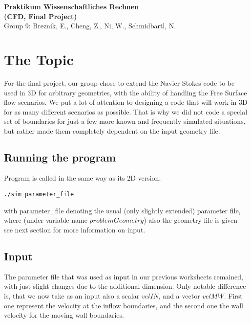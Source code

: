 \documentclass[a4paper, 12pt]{article}
\begin{document}
\begin{center}
{\LARGE \bf Praktikum Wissenschaftliches Rechnen \\ \vspace{0.2cm} (CFD, Final Project)}\\
\vspace{0.6cm}
{\small Group 9: Breznik, E., Cheng, Z., Ni, W., Schmidbartl, N.}
\end{center}
\normalfont
\section{The Topic}\label{sec:topic}
For the final project, our group chose to extend the Navier Stokes code to be used in 3D for arbitrary geometries, with the ability of handling
the Free Surface flow scenarios.
We put a lot of attention to designing a code that will work in 3D for as many different scenarios as possible. That is why we did not code a
special set of boundaries for just a few more known and frequently simulated situations, but rather made them completely dependent on the input
geometry file.

\subsection{Running the program}
Program is called in the same way as its 2D version;
\begin{center} 
\begin{verbatim}
./sim parameter_file
\end{verbatim}
\end{center}
with parameter\_file denoting the usual (only slightly extended) parameter file, where (under variable name $problemGeometry$) also the geometry file is 
given - see next section for more information on input. 

\subsection{Input}\label{sec:input}
The parameter file that was used as input in our previous worksheets remained, with just slight changes due to the additional dimension.
Only notable difference is, that we now take as an input also a scalar $velIN$, and a vector $velMW$. First one represent the velocity at the
inflow boundaries, and the second one the wall velocity for the moving wall boundaries. %
\end{document}
